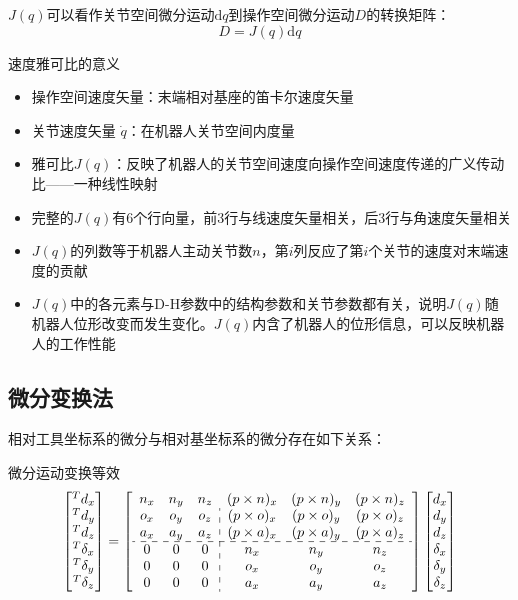$J(q)$可以看作关节空间微分运动$\mathrm{d}q$到操作空间微分运动$D$的转换矩阵：
$$
D = J(q) \mathrm{d}q
$$

\begin{note}
    速度雅可比的意义
    \begin{itemize}
        \item 操作空间速度矢量：末端相对基座的笛卡尔速度矢量
        \item 关节速度矢量 $\dot{q}$：在机器人关节空间内度量
        \item 雅可比$J(q)$：反映了机器人的关节空间速度向操作空间速度传递的广义传动比——一种线性映射
        \item 完整的$J(q)$有6个行向量，前3行与线速度矢量相关，后3行与角速度矢量相关
        \item $J(q)$的列数等于机器人主动关节数$n$，第$i$列反应了第$i$个关节的速度对末端速度的贡献
        \item $J(q)$中的各元素与D-H参数中的结构参数和关节参数都有关，说明$J(q)$随机器人位形改变而发生变化。$J(q)$内含了机器人的位形信息，可以反映机器人的工作性能
    \end{itemize}
\end{note}

\subsection{微分变换法}

相对工具坐标系的微分与相对基坐标系的微分存在如下关系：

微分运动变换等效
$$
\begin{bmatrix}
{}^T d_x \\
{}^T d_y \\
{}^T d_z \\
{}^T \delta_x \\
{}^T \delta_y \\
{}^T \delta_z
\end{bmatrix}
=
\left[
\begin{array}{ccc:ccc} %
n_x & n_y & n_z & (p \times n)_x & (p \times n)_y & (p \times n)_z \\
o_x & o_y & o_z & (p \times o)_x & (p \times o)_y & (p \times o)_z \\
a_x & a_y & a_z & (p \times a)_x & (p \times a)_y & (p \times a)_z \\
\hdashline %
0 & 0 & 0 & n_x & n_y & n_z \\
0 & 0 & 0 & o_x & o_y & o_z \\
0 & 0 & 0 & a_x & a_y & a_z
\end{array}
\right]
\begin{bmatrix}
d_x \\
d_y \\
d_z \\
\delta_x \\
\delta_y \\
\delta_z
\end{bmatrix}
$$


